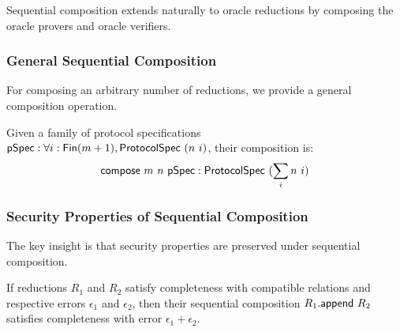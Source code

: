 \begin{definition}
    \label{def:oracle_reduction_append}
    Sequential composition extends naturally to oracle reductions by composing the oracle provers and oracle verifiers.
\end{definition}

\subsubsection{General Sequential Composition}

For composing an arbitrary number of reductions, we provide a general composition operation.

\begin{definition}
    \label{def:protocol_spec_compose}
    Given a family of protocol specifications $\mathsf{pSpec} : \forall i : \mathsf{Fin}(m+1), \mathsf{ProtocolSpec}\ (n\ i)$, their composition is:
    \[ \mathsf{compose}\ m\ n\ \mathsf{pSpec} : \mathsf{ProtocolSpec}\ (\sum_{i} n\ i) \]
\end{definition}

\begin{definition}
    \label{def:prover_compose}
\end{definition}

\begin{definition}
    \label{def:verifier_compose}
\end{definition}

\begin{definition}
    \label{def:reduction_compose}
\end{definition}

\subsubsection{Security Properties of Sequential Composition}

The key insight is that security properties are preserved under sequential composition.

\begin{theorem}
    \label{thm:completeness_append}
    If reductions $R_1$ and $R_2$ satisfy completeness with compatible relations and respective errors $\epsilon_1$ and $\epsilon_2$, then their sequential composition $R_1.\mathsf{append}\ R_2$ satisfies completeness with error $\epsilon_1 + \epsilon_2$.
\end{theorem}

